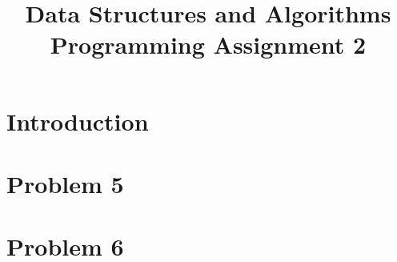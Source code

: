 \documentclass{article}
\begin{document}
\title{Data Structures and Algorithms \\ Programming Assignment 2}
\maketitle
\pagebreak
\tableofcontents
\pagebreak

\section{Introduction}

\section{Problem 5}

\section{Problem 6}
\end{document}
